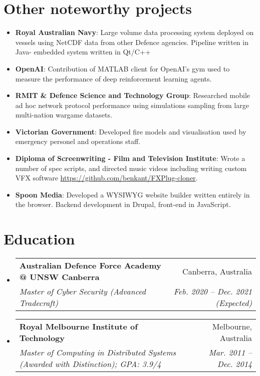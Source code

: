 \documentclass[11pt]{article}
\makeatletter
\newcommand{\resumeItem}[2]{
  \item\small{
    \textbf{#1}{: #2 \vspace{-2pt}}
  }
}
\newcommand{\resumeSubheading}[4]{
  \vspace{-1pt}\item
    \begin{tabular*}{0.97\textwidth}[t]{l@{\extracolsep{\fill}}r}
      \textbf{#1} & #2 \\
      \textit{\small#3} & \textit{\small #4} \\
    \end{tabular*}\vspace{-5pt}
}
\newcommand{\resumeSubItem}[2]{\resumeItem{#1}{#2}\vspace{-4pt}}
\newcommand{\resumeSubHeadingListStart}{\begin{itemize}[leftmargin=*]}
\newcommand{\resumeSubHeadingListEnd}{\end{itemize}}
\makeatother
\begin{document}
\section{Other noteworthy projects}
  \resumeSubHeadingListStart
    \resumeSubItem{Royal Australian Navy}
      {Large volume data processing system deployed on vessels using NetCDF data from other Defence agencies. Pipeline written in Java- embedded system written in Qt/C++}
    \resumeSubItem{OpenAI}
      {Contribution of MATLAB client for OpenAI's gym used to measure the performance of deep reinforcement learning agents.}
    \resumeSubItem{RMIT \& Defence Science and Technology Group}
      {Researched mobile ad hoc network protocol performance using simulations sampling from large multi-nation wargame datasets.}
    \resumeSubItem{Victorian Government}
      {Developed fire models and visualisation used by emergency personel and operations staff.}
    \resumeSubItem{Diploma of Screenwriting - Film and Television Institute}
      {Wrote a number of spec scripts, and directed music videos including writing custom VFX software \href{https://github.com/benkant/FXPlug-cloner}{https://github.com/benkant/FXPlug-cloner}.}
    \resumeSubItem{Spoon Media}
      {Developed a WYSIWYG website builder written entirely in the browser. Backend development in Drupal, front-end in JavaScript.}
  \resumeSubHeadingListEnd

\section{Education}
  \resumeSubHeadingListStart
    \resumeSubheading
      {Australian Defence Force Academy @ UNSW Canberra}{Canberra, Australia}
      {Master of Cyber Security (Advanced Tradecraft)}{Feb. 2020 -- Dec. 2021 (Expected)}
    \resumeSubheading
      {Royal Melbourne Institute of Technology}{Melbourne, Australia}
      {Master of Computing in Distributed Systems (Awarded with Distinction);  GPA: 3.9/4}{Mar. 2011 -- Dec. 2014}
  \resumeSubHeadingListEnd

\end{document}
